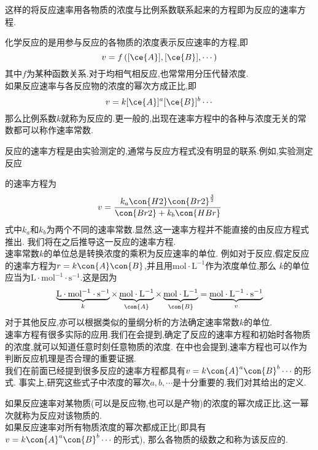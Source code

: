\documentclass{ctexart}
\begin{document}
这样的将反应速率用各物质的浓度与比例系数联系起来的方程即为反应的速率方程.
\begin{definition}[7A.2.1 速率方程与速率常数]
    化学反应的是用参与反应的各物质的浓度表示反应速率的方程,即
    \[v=f\left([\ce{A}],[\ce{B}],\cdots\right)\]
    其中$f$为某种函数关系.对于均相气相反应,也常常用分压代替浓度.\\
    如果反应速率与各反应物的浓度的幂次方成正比,即
    \[v=k[\ce{A}]^{a}[\ce{B}]^b\cdots\]
    那么比例系数$k$就称为反应的.更一般的,出现在速率方程中的各种与浓度无关的常数都可以称作速率常数.
\end{definition}
反应的速率方程是由实验测定的,通常与反应方程式没有明显的联系.例如,实验测定反应
\begin{tightcenter}
\end{tightcenter}
的速率方程为
\[v=\dfrac{k_a\con{H2}\con{Br2}^{\frac32}}{\con{Br2}+k_b\con{HBr}}\]
式中$k_a$和$k_b$为两个不同的速率常数.显然,这一速率方程并不能直接的由反应方程式推出.%
我们将在之后推导这一反应的速率方程.\\
\indent 速率常数$k$的单位总是转换浓度的乘积为反应速率的单位.%
例如对于反应,假定反应的速率方程为$r=k\con{A}\con{B}$,并且用$\text{mol}\cdot\text{L}^{-1}$作为浓度单位,那么%
$k$的单位应当为$\text{L}\cdot\text{mol}^{-1}\cdot\text{s}^{-1}$.这是因为
\[\underbrace{\text{L}\cdot\text{mol}^{-1}\cdot\text{s}^{-1}}_k
\times\underbrace{\text{mol}\cdot\text{L}^{-1}}_{\con{A}}
\times\underbrace{\text{mol}\cdot\text{L}^{-1}}_{\con{B}}
=\underbrace{\text{mol}\cdot\text{L}^{-1}\cdot\text{s}^{-1}}_v\]
对于其他反应,亦可以根据类似的量纲分析的方法确定速率常数$k$的单位.\\
\indent 速率方程有很多实际的应用.我们在会提到,确定了反应的速率方程和初始时各物质的浓度,就可以知道任意时刻任意物质的浓度.%
在中也会提到,速率方程也可以作为判断反应机理是否合理的重要证据.\vspace{4pt}\\
\indent 我们在前面已经提到很多反应的速率方程都具有$v=k\con{A}^a\con{B}^b\cdots$的形式.%
事实上,研究这些式子中浓度的幂次$a,b,\cdots$是十分重要的.我们对其给出的定义.
\begin{definition}[7A.2.2 反应级数]
    如果反应速率对某物质(可以是反应物,也可以是产物)的浓度的幂次成正比,这一幂次就称为反应对该物质的.\\
    如果反应速率对所有物质浓度的幂次都成正比(即具有$v=k\con{A}^a\con{B}^b\cdots$的形式),%
    那么各物质的级数之和称为该反应的.
\end{definition}
\end{document}
